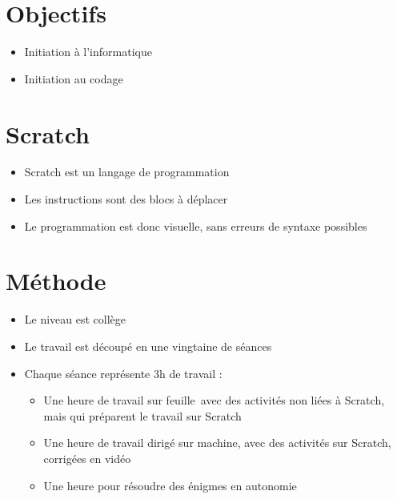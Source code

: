 \documentclass[class=report,crop=false, 12pt]{standalone}
\begin{document}




\section{Objectifs}

\begin{itemize}
\item Initiation à l'informatique
\item Initiation au codage
\end{itemize}


\section{Scratch}

\begin{itemize}
\item Scratch est un langage de programmation
\item Les instructions sont des blocs à déplacer
\item Le programmation est donc visuelle, sans erreurs de syntaxe possibles
\end{itemize}

\begin{figure}[htbp]
  \centering
  
\end{figure}


\section{Méthode}

\begin{itemize}
\item Le niveau est collège
\item Le travail est découpé en une vingtaine de séances
\item Chaque séance représente 3h de travail :
  \begin{itemize}
    \item Une heure de travail sur feuille~avec des activités non liées à
  Scratch, mais qui préparent le travail sur Scratch
    \item Une heure de travail dirigé sur machine, avec des activités sur
  Scratch, corrigées en vidéo
    \item Une heure pour résoudre des énigmes en autonomie
  \end{itemize}
\end{itemize}
\end{document}
